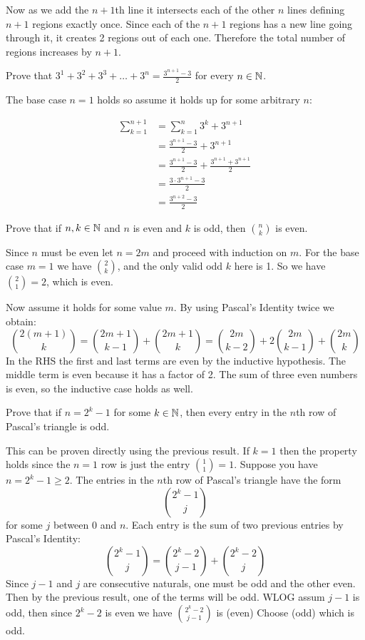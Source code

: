 \documentclass{article}
\begin{document}
Now as we add the $n+1$th line it intersects each of the other $n$ lines defining $n+1$ regions exactly once. Since each of the $n+1$ regions has a new line going through it, it creates 2 regions out of each one. Therefore the total number of regions increases by $n+1$.

\begin{problem}
Prove that $3^1 + 3^2 + 3^3 + \ldots + 3^n = \frac{3^{n+1} - 3}{2}$ for every $n \in \mathbb{N}$.
\end{problem}

The base case $n = 1$ holds so assume it holds up for some arbitrary $n$:

\begin{align*}
  \sum_{k=1}^{n+1} & = \sum_{k=1}^n 3^k + 3^{n+1}                          \\
                   & = \frac{3^{n+1} - 3}{2} + 3^{n+1}                     \\
                   & = \frac{3^{n+1} - 3}{2} + \frac{3^{n+1} + 3^{n+1}}{2} \\
                   & = \frac{3\cdot 3^{n+1} - 3}{2}                        \\
                   & = \frac{3^{n+2} - 3}{2}
\end{align*}

\begin{problem}
Prove that if $n, k \in \mathbb{N}$ and $n$ is even and $k$ is odd, then $\binom{n}{k}$ is even.
\end{problem}

Since $n$ must be even let $n = 2m$ and proceed with induction on $m$. For the base case $m = 1$ we have $\binom{2}{k}$, and the only valid odd $k$ here is 1. So we have $\binom{2}{1} = 2$, which is even.

Now assume it holds for some value $m$. By using Pascal's Identity twice we obtain:
$$\binom{2(m+1)}{k} = \binom{2m + 1}{k-1} + \binom{2m+1}{k} = \binom{2m}{k-2} + 2\binom{2m}{k-1} + \binom{2m}{k}$$
In the RHS the first and last terms are even by the inductive hypothesis. The middle term is even because it has a factor of 2. The sum of three even numbers is even, so the inductive case holds as well.

\begin{problem}
Prove that if $n = 2^k - 1$ for some $k \in \mathbb{N}$, then every entry in the $n$th row of Pascal's triangle is odd.
\end{problem}

This can be proven directly using the previous result. If $k = 1$ then the property holds since the $n = 1$ row is just the entry $\binom{1}{1} = 1$. Suppose you have $n = 2^k -1 \geq 2$. The entries in the $n$th row of Pascal's triangle have the form
$$\binom{2^k - 1}{j}$$
for some $j$ between 0 and $n$. Each entry is the sum of two previous entries by Pascal's Identity:
$$\binom{2^k - 1}{j} = \binom{2^k - 2}{j-1} + \binom{2^k - 2}{j}$$
Since $j-1$ and $j$ are consecutive naturals, one must be odd and the other even. Then by the previous result, one of the terms will be odd. WLOG assum $j-1$ is odd, then since $2^k - 2$ is even we have $\binom{2^k - 2}{j-1}$ is (even) Choose (odd) which is odd.
\end{document}

